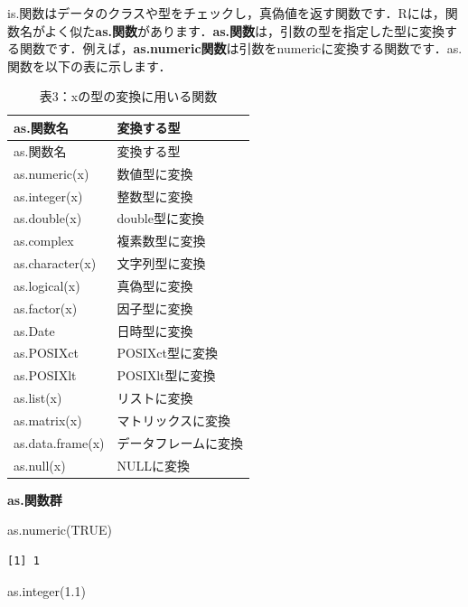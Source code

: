 \documentclass[
  letterpaper,
  DIV=11,
  numbers=noendperiod]{scrreprt}
\newenvironment{Shaded}{\begin{snugshade}}{\end{snugshade}}
\newcommand{\ConstantTok}[1]{\textcolor[rgb]{0.56,0.35,0.01}{#1}}
\newcommand{\FloatTok}[1]{\textcolor[rgb]{0.68,0.00,0.00}{#1}}
\newcommand{\FunctionTok}[1]{\textcolor[rgb]{0.28,0.35,0.67}{#1}}
\newcommand{\NormalTok}[1]{\textcolor[rgb]{0.00,0.23,0.31}{#1}}
\begin{document}
is.関数はデータのクラスや型をチェックし，真偽値を返す関数です．Rには，関数名がよく似た\textbf{as.関数}があります．\textbf{as.関数}は，引数の型を指定した型に変換する関数です．例えば，\textbf{as.numeric関数}は引数をnumericに変換する関数です．as.関数を以下の表に示します．

\begin{longtable}[]{@{}ll@{}}
\caption{表3：xの型の変換に用いる関数}\tabularnewline
\toprule()
as.関数名 & 変換する型 \\
\midrule()
\endfirsthead
\toprule()
as.関数名 & 変換する型 \\
\midrule()
\endhead
as.numeric(x) & 数値型に変換 \\
as.integer(x) & 整数型に変換 \\
as.double(x) & double型に変換 \\
as.complex & 複素数型に変換 \\
as.character(x) & 文字列型に変換 \\
as.logical(x) & 真偽型に変換 \\
as.factor(x) & 因子型に変換 \\
as.Date & 日時型に変換 \\
as.POSIXct & POSIXct型に変換 \\
as.POSIXlt & POSIXlt型に変換 \\
as.list(x) & リストに変換 \\
as.matrix(x) & マトリックスに変換 \\
as.data.frame(x) & データフレームに変換 \\
as.null(x) & NULLに変換 \\
\bottomrule()
\end{longtable}

\textbf{as.関数群}

\begin{Shaded}
\begin{Highlighting}[]
\FunctionTok{as.numeric}\NormalTok{(}\ConstantTok{TRUE}\NormalTok{)}
\end{Highlighting}
\end{Shaded}

\begin{verbatim}
[1] 1
\end{verbatim}

\begin{Shaded}
\begin{Highlighting}[]
\FunctionTok{as.integer}\NormalTok{(}\FloatTok{1.1}\NormalTok{)}
\end{Highlighting}
\end{Shaded}
\end{document}
